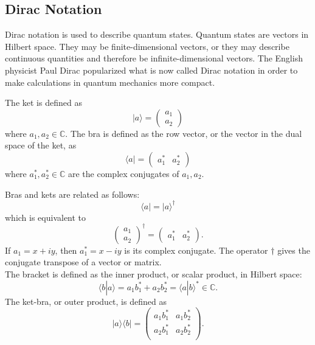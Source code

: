 \documentclass[a4paper]{article}
\begin{document}
\subsection{Dirac Notation}
Dirac notation is used to describe quantum states. Quantum states are vectors in Hilbert space. They may be finite-dimensional vectors, or they may describe continuous quantities and therefore be infinite-dimensional vectors. The English physicist Paul Dirac popularized what is now called Dirac notation in order to make calculations in quantum mechanics more compact.

The ket is defined as
\begin{equation}
|a\rangle=
	\begin{pmatrix}
		a_1\\
		a_2
	\end{pmatrix}
\end{equation}
where $a_1, a_2 \in \mathbb{C}$. The bra is defined as the row vector, or the vector in the dual space of the ket, as
\begin{equation}
\langle a|=
	\begin{pmatrix}
		a_1^*&a_2^*
	\end{pmatrix}
\end{equation}
where $a_1^*, a_2^* \in \mathbb{C}$ are the complex conjugates of $a_1, a_2$.

Bras and kets are related as follows:
\begin{equation}
\langle a|=|a\rangle^\dagger
\end{equation}
which is equivalent to
\begin{equation}
\begin{pmatrix}
		a_1\\
		a_2
	\end{pmatrix}^\dagger=
	\begin{pmatrix}
		a_1^*&a_2^*
	\end{pmatrix}.
\end{equation}
If $a_1=x+iy$, then $a_1^*=x-iy$ is its complex conjugate. The operator $\dagger$ gives the conjugate transpose of a vector or matrix.\\

The bracket is defined as the inner product, or scalar product, in Hilbert space:
\begin{equation}
\langle b | a\rangle=a_1b_1^*+a_2b_2^*=\langle a | b\rangle^*\in \mathbb{C}.
\end{equation}
The ket-bra, or outer product, is defined as
\begin{equation}
|a\rangle\langle b|=
	\begin{pmatrix}
		a_1 b_1^*& a_1 b_2^*\\
		a_2 b_1^*& a_2 b_2^*\\
	\end{pmatrix}.
\end{equation}
\end{document}
